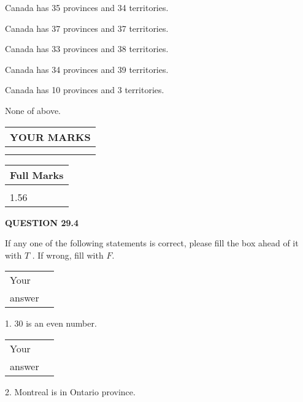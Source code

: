 \documentclass[12pt]{article}
\begin{document}
  
 
 
Canada has  %
35 provinces and  %
34 territories.
 
 
Canada has  %
37 provinces and  %
37 territories.
 
 
Canada has  %
33 provinces and  %
38 territories.
 
 
Canada has  %
34 provinces and  %
39 territories.
 
 
Canada has  %
10 provinces and  %
3 territories.
 
 
 None of above.
 
 
  
\vspace{0.2in}
  
\noindent\begin{tabular}{|l|}
\hline
 YOUR MARKS  \\
\hline
 \\ 
 \\ 
\hline
\end{tabular}
\hspace{0.05in} \begin{tabular}{|l|}
\hline
 Full Marks  \\
\hline
 \\ 
1.56 \\
\hline
\end{tabular}
{\textbf{\Large{QUESTION
29.4 
}}}
  
  
If any one of the following statements is correct, please fill the box ahead of it with $T$ .
If wrong, fill with $F$.
 
\noindent\begin{tabular}{|l|l|}\hline Your&\hspace{.2in} \\ answer&\hspace{.2in} \\ \hline \end{tabular}
1. $ %
30$ is an  %
even number.
 
\noindent\begin{tabular}{|l|l|}\hline Your&\hspace{.2in} \\ answer&\hspace{.2in} \\ \hline \end{tabular}
2.  %
Montreal is in  %
Ontario province.
 
\end{document}
